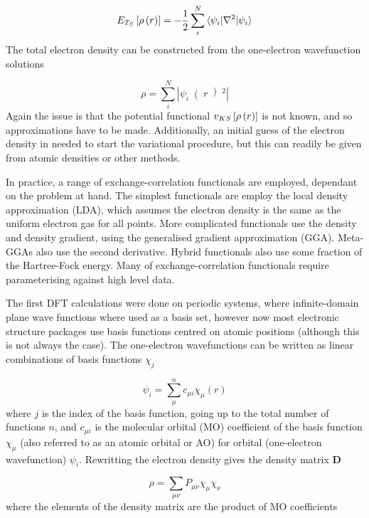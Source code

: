 \begin{equation}
    E_{T_S} \left[ \rho\left(r\right) \right] = -\frac{1}{2} \sum_i^N \braket{\psi_i|\nabla^2|\psi_i}
\end{equation}
%
The total electron density can be constructed from the one-electron wavefunction
solutions

\begin{equation}
    \rho = \sum_i^N \left\lvert \psi_i \right( r \left)^2 \right\rvert 
\end{equation}
%
Again the issue is that the potential functional $v_{KS} \left[ \rho\left(r\right) \right]$ is
not known, and so approximations have to be made. Additionally, an initial guess 
of the electron density in needed to start the variational procedure, but this can
readily be given from atomic densities or other methods.

In practice, a range of exchange-correlation functionals are employed, dependant
on the problem at hand. The simplest functionals are employ the local density approximation
(LDA), which assumes the electron density is the same as the uniform electron gas
for all points. More complicated functionals use the density and density gradient,
using the generalised gradient approximation (GGA). Meta-GGAs also use the second
derivative. Hybrid functionals also use some fraction of the Hartree-Fock energy.
Many of exchange-correlation functionals require parameterising against high level
data.

The first DFT calculations were done on periodic systems, where infinite-domain
plane wave functions where used as a basis set, however now most electronic structure
packages use basis functions centred on atomic positions (although this is not always
the case). The one-electron wavefunctions can be written as linear combinations 
of basis functions $\chi_j$

\begin{equation}
    \psi_i = \sum_\mu^n c_{\mu i} \chi_\mu \left( r\right)
\end{equation}
%
where $j$ is the index of the basis function, going up to the total number of functions
$n$, and $c_{\mu i}$ is the molecular orbital (MO) coefficient of the basis function
$\chi_\mu$ (also referred to as an atomic orbital or AO) for orbital (one-electron 
wavefunction) $\psi_i$. Rewritting the electron density gives the density matrix 
$\mathbf{D}$

\begin{equation}
    \rho = \sum_{\mu\nu} P_{\mu\nu} \chi_\mu \chi_\nu
\end{equation}
%
where the elements of the density matrix are the product of MO coefficients

